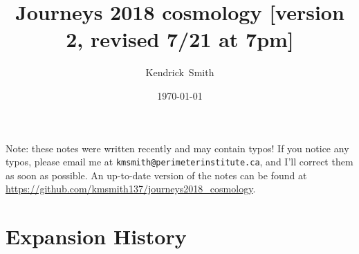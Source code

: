 \documentclass[aps,prd,superscriptaddress,groupedaddress,nofootinbib,nobibnotes]{revtex4}
\begin{document}
\title{Journeys 2018 cosmology [version 2, revised 7/21 at 7pm]}

\author{Kendrick~Smith}

\date{\today}


\maketitle

\par\noindent
Note: these notes were written recently and may contain typos!  If you notice any typos, please
email me at {\tt kmsmith@perimeterinstitute.ca}, and I'll correct them as soon as possible.  An up-to-date
version of the notes can be found at \url{https://github.com/kmsmith137/journeys2018_cosmology}.

\section{Expansion History}
\end{document}
